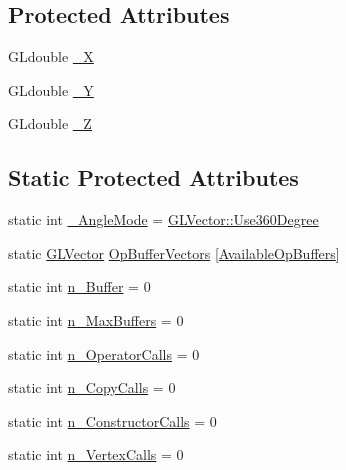 \subsection*{\-Protected \-Attributes}
\begin{DoxyCompactItemize}
\item 
\-G\-Ldouble \hyperlink{classGLVector_a9450f309bf0b64245937f36606a3489f}{\-\_\-\-X}
\item 
\-G\-Ldouble \hyperlink{classGLVector_a638c2f737d3fce449d64e5aae5b15aa8}{\-\_\-\-Y}
\item 
\-G\-Ldouble \hyperlink{classGLVector_a95097d48b78403b59733b95ac857656a}{\-\_\-\-Z}
\end{DoxyCompactItemize}
\subsection*{\-Static \-Protected \-Attributes}
\begin{DoxyCompactItemize}
\item 
static int \hyperlink{classGLVector_a7bbb126b09ba6c37cc010528ae913ce3}{\-\_\-\-Angle\-Mode} = \hyperlink{classGLVector_abb139fb8951c3eda14b0eb7d74c0504e}{\-G\-L\-Vector\-::\-Use360\-Degree}
\item 
static \hyperlink{classGLVector}{\-G\-L\-Vector} \hyperlink{classGLVector_aa4888b5e8b587095f9ea31991a5c072a}{\-Op\-Buffer\-Vectors} \mbox{[}\hyperlink{classGLVector_a6993a627d920674f67b9a616ff2e931f}{\-Available\-Op\-Buffers}\mbox{]}
\item 
static int \hyperlink{classGLVector_a22483a8861e1ab14f4c547092897969f}{n\-\_\-\-Buffer} = 0
\item 
static int \hyperlink{classGLVector_a264f756b5ee6a1402deb00ff8bf1d55e}{n\-\_\-\-Max\-Buffers} = 0
\item 
static int \hyperlink{classGLVector_a69df2dd2bd7a93ca4530c514f8b70f16}{n\-\_\-\-Operator\-Calls} = 0
\item 
static int \hyperlink{classGLVector_ad399536bb23ff481180e7eb0a92e9de3}{n\-\_\-\-Copy\-Calls} = 0
\item 
static int \hyperlink{classGLVector_aa4ac1dd82aca534dee654d1d5c93ed73}{n\-\_\-\-Constructor\-Calls} = 0
\item 
static int \hyperlink{classGLVector_a385e153f287c7b5c5b9fe21dafd81af3}{n\-\_\-\-Vertex\-Calls} = 0
\end{DoxyCompactItemize}


